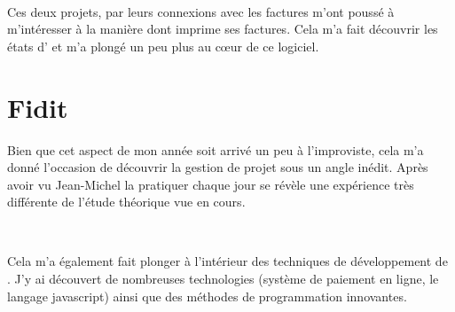 ~

Ces deux projets, par leurs connexions avec les factures m'ont poussé à m'intéresser à la manière dont \integrale{} imprime ses factures. Cela m'a fait découvrir les \og états \fg{} d' et m'a plongé un peu plus au cœur de ce logiciel.

\section{Fidit}
Bien que cet aspect de mon année soit arrivé un peu à l'improviste, cela m'a donné l'occasion de découvrir la gestion de projet sous un angle inédit. Après avoir vu Jean-Michel  la pratiquer chaque jour se révèle une expérience très différente de l'étude théorique vue en cours.

~

Cela m'a également fait plonger à l'intérieur des techniques de développement de \fidit. J'y ai découvert de nombreuses technologies (système de paiement en ligne, le langage javascript) ainsi que des méthodes de programmation innovantes.
